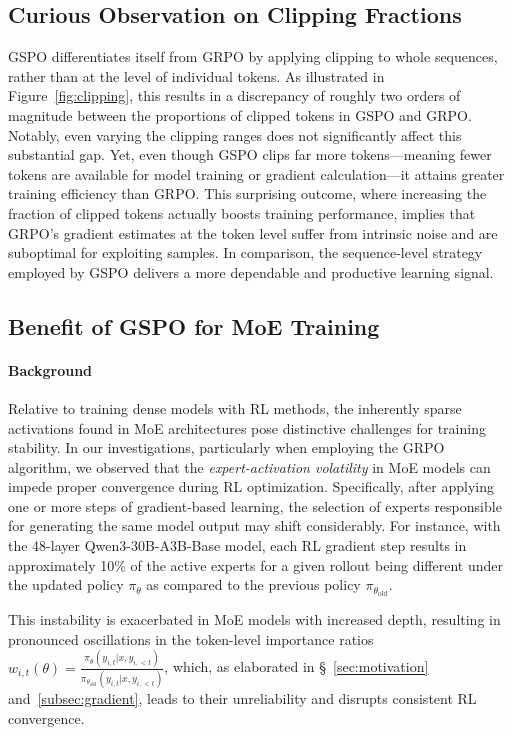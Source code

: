 \subsection{Curious Observation on Clipping Fractions}

GSPO differentiates itself from GRPO by applying clipping to whole sequences, rather than at the level of individual tokens. As illustrated in Figure~\ref{fig:clipping}, this results in a discrepancy of roughly two orders of magnitude between the proportions of clipped tokens in GSPO and GRPO. Notably, even varying the clipping ranges does not significantly affect this substantial gap. Yet, even though GSPO clips far more tokens—meaning fewer tokens are available for model training or gradient calculation—it attains greater training efficiency than GRPO. This surprising outcome, where increasing the fraction of clipped tokens actually boosts training performance, implies that GRPO’s gradient estimates at the token level suffer from intrinsic noise and are suboptimal for exploiting samples. In comparison, the sequence-level strategy employed by GSPO delivers a more dependable and productive learning signal.

\subsection{Benefit of GSPO for MoE Training}
\label{subsec:routing_replay}

\paragraph{Background}
Relative to training dense models with RL methods, the inherently sparse activations found in MoE architectures pose distinctive challenges for training stability. In our investigations, particularly when employing the GRPO algorithm, we observed that the \textit{expert-activation volatility} in MoE models can impede proper convergence during RL optimization. Specifically, after applying one or more steps of gradient-based learning, the selection of experts responsible for generating the same model output may shift considerably. For instance, with the 48-layer Qwen3-30B-A3B-Base model, each RL gradient step results in approximately 10\% of the active experts for a given rollout being different under the updated policy $\pi_{\theta}$ as compared to the previous policy $\pi_{\theta_\text{old}}$.

This instability is exacerbated in MoE models with increased depth, resulting in pronounced oscillations in the token-level importance ratios $w_{i,t}(\theta) = \frac{ \pi_{\theta} (y_{i,t} | x, y_{i,<t}) }{ \pi_{\theta_\text{old}} (y_{i,t} | x,y_{i,<t})}$, which, as elaborated in \S~\ref{sec:motivation} and~\ref{subsec:gradient}, leads to their unreliability and disrupts consistent RL convergence.

